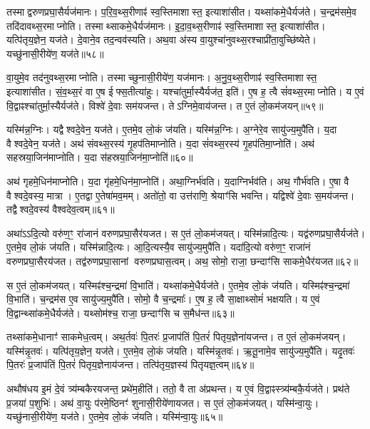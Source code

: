 तस्माद्वरुणप्रघा॒सैर्यज॑मानः।
प॒रि॒व॒थ्स॒रीणाꣴ॑ स्व॒स्तिमा\-शास्त॒ इत्याशा॑सीत।
यथ्सा॑कमे॒धैर्यज॑ते।
च॒न्द्रम॑समे॒व तदि॑दावथ्स॒र\-माप्नोति।
तस्माथ्साकमे॒धैर्यज॑मानः।
इ॒दा॒व॒थ्स॒रीणाꣴ॑ स्व॒स्तिमाशास्त॒ इत्याशा॑सीत।
यत्पि॑तृय॒ज्ञेन॒ यज॑ते।
दे॒वाने॒व तद॒न्वव॑स्यति।
अथ॒वा अ॑स्य वा॒युश्चा॑नुवथ्स॒रश्चाप्री॑ता॒\-वुच्छि॑ष्येते।
यच्छु॑नासी॒रीये॑ण॒ यज॑ते॥५८॥

वा॒युमे॒व तद॑नुवथ्स॒रमाप्नोति।
तस्माच्छुनासी॒रीये॑ण॒ यज॑मानः।
अ॒नु॒व॒थ्स॒रीणाꣴ॑ स्व॒स्तिमाशास्त॒ इत्याशा॑सीत।
सं॒व॒थ्स॒रं वा ए॒ष ई\hspace{0.4ex}\hspace{-0.4ex}फ्स॒तीत्या॑हुः।
यश्चा॑तुर्मा॒स्यैर्यज॑त॒ इति॑।
ए॒ष ह॒ त्वै सं॑वथ्स॒रमाप्नोति।
य ए॒वं वि॒द्वाꣴश्चा॑तुर्मा॒स्यैर्यज॑ते।
विश्वे॑ दे॒वाः सम॑यजन्त।
तेऽग्निमे॒वाय॑जन्त।
त ए॒तं लो॒कम॑जयन्॥५९॥

यस्मि॑न्न॒ग्निः।
यद्वैश्वदे॒वेन॒ यज॑ते।
ए॒तमे॒व लो॒कं ज॑यति।
यस्मि॑न्न॒ग्निः।
अ॒ग्नेरे॒व सायु॑ज्य॒मुपै॑ति।
य॒दा वैश्वदे॒वेन॒ यज॑ते।
अथ॑ संवथ्स॒रस्य॑ गृ॒हप॑तिमाप्नोति।
य॒दा सं॑वथ्स॒रस्य॑ गृ॒हप॑तिमा॒प्नोति॑।
अथ॑ सहस्रया॒जिन॑माप्नोति।
य॒दा स॑हस्रया॒जिन॑मा॒प्नोति॑॥६०॥

अथ॑ गृहमे॒धिन॑माप्नोति।
य॒दा गृ॑हमे॒धिन॑मा॒प्नोति॑।
अथा॒ग्निर्भ॑वति।
य॒दाग्निर्भव॑ति।
अथ॒ गौर्भ॑वति।
ए॒षा वै वैश्वदे॒वस्य॒ मात्रा।
ए॒तद्वा ए॒तेषा॑मव॒मम्।
अतो॑तो॒ वा उत्त॑राणि॒ श्रेयाꣳ॑सि भवन्ति।
यद्विश्वे॑ दे॒वाः स॒मय॑जन्त।
तद्वैश्वदे॒वस्य॑ वैश्वदेव॒त्वम्॥६१॥

अथा॑ऽऽदि॒त्यो वरु॑ण॒ꣳ॒ रा॑जानं वरुणप्रघा॒सैर॑यजत।
स ए॒तं लो॒कम॑जयत्।
यस्मि॑न्नादि॒त्यः।
यद्व॑रुणप्रघा॒सैर्यज॑ते।
ए॒तमे॒व लो॒कं ज॑यति।
यस्मि॑न्नादि॒त्यः।
आ॒दि॒त्यस्यै॒व सायु॑ज्य॒मुपै॑ति।
यदा॑दि॒त्यो वरु॑ण॒ꣳ॒ राजा॑नं वरुणप्रघा॒सै\-रय॑जत।
तद्व॑रुणप्रघा॒सानां वरुणप्रघास॒त्वम्।
अथ॒ सोमो॒ राजा॒ छन्दाꣳ॑सि साकमे॒धैर॑यजत॥६२॥

स ए॒तं लो॒कम॑जयत्।
यस्मिꣴ॑श्च॒न्द्रमा॑ वि॒भाति॑।
यथ्सा॑कमे॒धैर्यज॑ते।
ए॒तमे॒व लो॒कं ज॑यति।
यस्मिꣴ॑श्च॒न्द्रमा॑ वि॒भाति॑।
च॒न्द्रम॑स ए॒व सायु॑ज्य॒मुपै॑ति।
सोमो॒ वै च॒न्द्रमाः᳚।
ए॒ष ह॒ त्वै सा॒क्षाथ्सोमं॑ भक्षयति।
य ए॒वं वि॒द्वान्थ्सा॑कमे॒धैर्यज॑ते।
यथ्सोम॑श्च॒ राजा॒ छन्दाꣳ॑सि च स॒मैध॑न्त॥६३॥

तथ्सा॑कमे॒धानाꣳ॑ साकमेध॒त्वम्।
अथ॒र्तवः॑ पि॒तरः॑ प्र॒जाप॑तिं पि॒तरं॑ पितृय॒ज्ञेना॑यजन्त।
त ए॒तं लो॒कम॑जयन्।
यस्मि॑न्नृ॒तवः॑।
यत्पि॑तृय॒ज्ञेन॒ यज॑ते।
ए॒तमे॒व लो॒कं ज॑यति।
यस्मि॑न्नृ॒तवः॑।
ऋ॒तू॒नामे॒व सायु॑ज्य॒मुपै॑ति।
यदृ॒तवः॑ पि॒तरः॑ प्र॒जाप॑तिं पि॒तरं॑ पितृय॒ज्ञेनाय॑जन्त।
तत्पि॑तृय॒ज्ञस्य॑ पितृयज्ञ॒त्वम्॥६४॥

अथौष॑धय इ॒मं दे॒वं त्र्य॑म्बकैरयजन्त॒ प्रथे॑म॒हीति॑।
ततो॒ वै ता अ॑प्रथन्त।
य ए॒वं वि॒द्वाꣴस्त्र्य॑म्बकै॒र्यज॑ते।
प्रथ॑ते प्र॒जया॑ प॒शुभिः॑।
अथ॑ वा॒युः प॑रमे॒ष्ठिनꣳ॑ शुनासी॒रीये॑णायजत।
स ए॒तं लो॒कम॑जयत्।
यस्मि॑न्वा॒युः।
यच्छु॑नासी॒रीये॑ण॒ यज॑ते।
ए॒तमे॒व लो॒कं ज॑यति।
यस्मि॑न्वा॒युः॥६५॥

